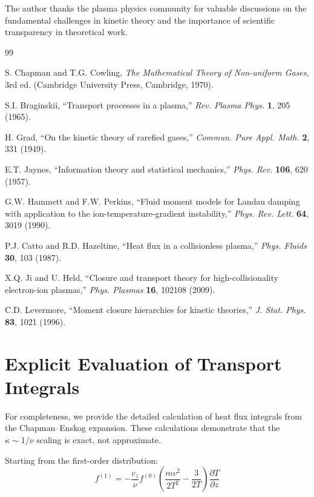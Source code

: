 \documentclass[12pt,a4paper]{article}
\begin{document}
The author thanks the plasma physics community for valuable discussions on the fundamental challenges in kinetic theory and the importance of scientific transparency in theoretical work.

\begin{thebibliography}{99}

S. Chapman and T.G. Cowling, \textit{The Mathematical Theory of Non-uniform Gases}, 3rd ed. (Cambridge University Press, Cambridge, 1970).

S.I. Braginskii, ``Transport processes in a plasma,'' \textit{Rev. Plasma Phys.} \textbf{1}, 205 (1965).

H. Grad, ``On the kinetic theory of rarefied gases,'' \textit{Commun. Pure Appl. Math.} \textbf{2}, 331 (1949).

E.T. Jaynes, ``Information theory and statistical mechanics,'' \textit{Phys. Rev.} \textbf{106}, 620 (1957).

G.W. Hammett and F.W. Perkins, ``Fluid moment models for Landau damping with application to the ion-temperature-gradient instability,'' \textit{Phys. Rev. Lett.} \textbf{64}, 3019 (1990).

P.J. Catto and R.D. Hazeltine, ``Heat flux in a collisionless plasma,'' \textit{Phys. Fluids} \textbf{30}, 103 (1987).

X.Q. Ji and U. Held, ``Closure and transport theory for high-collisionality electron-ion plasmas,'' \textit{Phys. Plasmas} \textbf{16}, 102108 (2009).

C.D. Levermore, ``Moment closure hierarchies for kinetic theories,'' \textit{J. Stat. Phys.} \textbf{83}, 1021 (1996).

\end{thebibliography}

\appendix

\section{Explicit Evaluation of Transport Integrals}

For completeness, we provide the detailed calculation of heat flux integrals from the Chapman--Enskog expansion. These calculations demonstrate that the $\kappa \sim 1/\nu$ scaling is exact, not approximate.

Starting from the first-order distribution:
\begin{equation}
f^{(1)} = -\frac{v_z}{\nu} f^{(0)} \left(\frac{mv^2}{2T^2} - \frac{3}{2T}\right) \frac{\partial T}{\partial z}
\label{eq:f1_appendix}
\end{equation}
\end{document}

